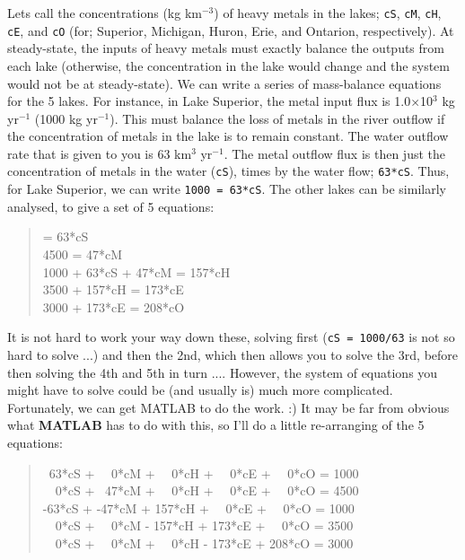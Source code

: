 \documentclass{tufte-book} %
\newenvironment{docspec}{\begin{quotation}\ttfamily\parskip0pt\parindent0pt\ignorespaces}{\end{quotation}}
\begin{document}
Lets call the concentrations (kg km\(^{-3}\)) of heavy metals in the lakes; \texttt{cS}, \texttt{cM}, \texttt{cH}, \texttt{cE}, and \texttt{cO} (for; Superior, Michigan, Huron, Erie, and Ontarion, respectively). At steady-state, the inputs of heavy metals must exactly balance the outputs from each lake (otherwise, the concentration in the lake would change and the system would not be at steady-state). We can write a series of mass-balance equations for the 5 lakes. For instance, in Lake Superior, the metal input flux is 1.0\(\times\)10\(^{3}\) kg yr\(^{-1}\) (1000 kg yr\(^{-1}\)). This must balance the loss of metals in the river outflow if the concentration of metals in the lake is to remain constant. The water outflow rate that is given to you is 63 km\(^{3}\) yr\(^{-1}\). The metal outflow flux is then just the concentration of metals in the water (\texttt{cS}), times by the water flow; \texttt{63*cS}. Thus, for Lake Superior, we can write \texttt{1000 = 63*cS}. The other lakes can be similarly analysed, to give a set of 5 equations:

\begin{docspec}
1000 = 63*cS 
\\4500 = 47*cM
\\1000 + 63*cS + 47*cM = 157*cH
\\3500 + 157*cH = 173*cE
\\3000 + 173*cE = 208*cO
\end{docspec}

It is not hard to work your way down these, solving first (\texttt{cS = 1000/63} is not so hard to solve ...) and then the 2nd, which then allows you to solve the 3rd, before then solving the 4th and 5th in turn .... However, the system of equations you might have to solve could be (and usually is) much more complicated. Fortunately, we can get MATLAB to do the work. :) It may be far from obvious what \textbf{MATLAB} has to do with this, so I'll do a little re-arranging of the 5 equations:

\begin{docspec}
\ 63*cS + \ \ 0*cM + \ \ 0*cH + \ \ 0*cE +  \ \ 0*cO = 1000
\\\ \ 0*cS + \ 47*cM + \ \  0*cH + \ \ 0*cE +  \ \ 0*cO = 4500
\\ -63*cS + -47*cM + 157*cH + \ \ 0*cE +  \ \ 0*cO = 1000 
\\\ \ 0*cS + \ \ 0*cM - 157*cH + 173*cE +  \ \ 0*cO = 3500
\\\ \ 0*cS + \ \ 0*cM + \ \ 0*cH - 173*cE + 208*cO = 3000 
\end{docspec}
\end{document}

